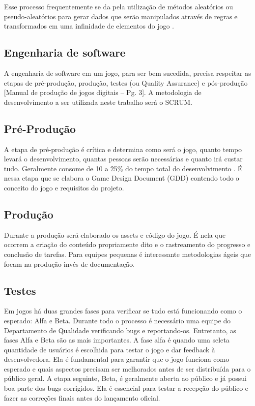 \documentclass[12pt, 
openright, 
oneside, 
a4paper,    
brazil]{facom-ufu-abntex2}
\begin{document}
Esse processo frequentemente se da pela utilização de métodos aleatórios ou pseudo-aleatórios para gerar dados que serão manipulados através de regras e transformados em uma infinidade de elementos do jogo \cite{PCGWiki}.

\iffalse
\subsection{Engenharia de software}
A engenharia de software em um jogo, para ser bem sucedida, precisa respeitar as etapas de pré-produção, produção, testes (ou Quality Assurance) e pós-produção [Manual de produção de jogos digitais – Pg. 3]. A metodologia de desenvolvimento a ser utilizada neste trabalho será o SCRUM.

\subsection{Pré-Produção}
A etapa de pré-produção é crítica e determina como será o jogo, quanto tempo levará o desenvolvimento, quantas pessoas serão necessárias e quanto irá custar tudo. Geralmente consome de 10 a 25\% do tempo total do desenvolvimento \cite{Manualdejogosdigitais}. É nessa etapa que se elabora o Game Design Document (GDD) contendo todo o conceito do jogo e requisitos do projeto.

\subsection{Produção}
Durante a produção será elaborado os assets e código do jogo. É nela que ocorrem a criação do conteúdo propriamente dito e o rastreamento do progresso e conclusão de tarefas\cite{Manualdejogosdigitais}. Para equipes pequenas é interessante metodologias ágeis que focam na produção invés de documentação.

\subsection{Testes}
Em jogos há duas grandes fases para verificar se tudo está funcionando como o esperado: Alfa e Beta. Durante todo o processo é necessário uma equipe do Departamento de Qualidade verificando bugs e reportando-os. Entretanto, as fases Alfa e Beta são as mais importantes. A fase alfa é quando uma seleta quantidade de usuários é escolhida para testar o jogo e dar feedback à desenvolvedora. Ela é fundamental para garantir que o jogo funciona como esperado e quais aspectos precisam ser melhorados antes de ser distribuída para o público geral. A etapa seguinte, Beta, é geralmente aberta ao público e já possui boa parte dos bugs corrigidos. Ela é essencial para testar a recepção do público e fazer as correções finais antes do lançamento oficial.
\end{document}
